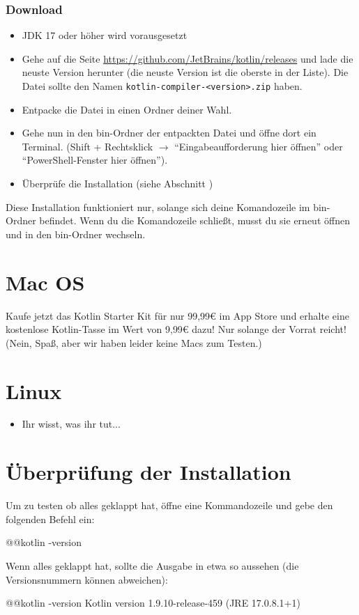 \subsubsection*{Download}
\begin{itemize}
    \item JDK 17 oder höher wird vorausgesetzt
    \item Gehe auf die Seite \url{https://github.com/JetBrains/kotlin/releases} und lade die neuste Version herunter (die neuste Version ist die oberste in der Liste). Die Datei sollte den Namen \texttt{kotlin-compiler-<version>.zip} haben. 
    \item Entpacke die Datei in einen Ordner deiner Wahl. 
    \item Gehe nun in den bin-Ordner der entpackten Datei und öffne dort ein Terminal. (Shift + Rechtsklick $\rightarrow$ \enquote{Eingabeaufforderung hier öffnen} oder \enquote{PowerShell-Fenster hier öffnen}).
    \item Überprüfe die Installation (siehe Abschnitt )
\end{itemize}
\begin{hinweis}
    Diese Installation funktioniert nur, solange sich deine Komandozeile im bin-Ordner befindet. Wenn du die Komandozeile schließt, musst du sie erneut öffnen und in den bin-Ordner wechseln.
\end{hinweis}
\section*{Mac OS}
Kaufe jetzt das Kotlin Starter Kit für nur 99,99€ im App Store und erhalte eine kostenlose Kotlin-Tasse im Wert von 9,99€ dazu! Nur solange der Vorrat reicht! (Nein, Spaß, aber wir haben leider keine Macs zum Testen.)

\section*{Linux}
\begin{itemize}
    \item Ihr wisst, was ihr tut...
\end{itemize}

\section*{Überprüfung der Installation}\label{sec:check}
Um zu testen ob alles geklappt hat, öffne eine Kommandozeile und gebe den folgenden Befehl ein:
\begin{commandshell}
    @\shellprefix{}@kotlin -version
\end{commandshell}

Wenn alles geklappt hat, sollte die Ausgabe in etwa so aussehen (die Versionsnummern können abweichen):
\begin{commandshell}[][]
    @\shellprefix{}@kotlin -version
        Kotlin version 1.9.10-release-459 (JRE 17.0.8.1+1)
\end{commandshell}


